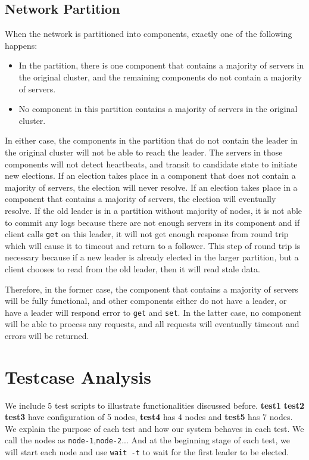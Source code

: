 \documentclass[11pt]{article}
\begin{document}
\subsection{Network Partition}

When the network is partitioned into components, exactly one of the following happens:
\begin{itemize}
    \item In the partition, there is one component that contains a majority of servers in the original cluster, and the remaining components do not contain a majority of servers.
    \item No component in this partition contains a majority of servers in the original cluster.
\end{itemize}

In either case, the components in the partition that do not contain the leader in the original cluster will not be able to reach the leader. The servers in those components will not detect heartbeats, and transit to candidate state to initiate new elections. If an election takes place in a component that does not contain a majority of servers, the election will never resolve. If an election takes place in a component that contains a majority of servers, the election will eventually resolve. If the old leader is in a partition without majority of nodes, it is not able to commit any logs because there are not enough servers in its component and if client calls \texttt{get} on this leader, it will not get enough response from round trip which will cause it to timeout and return to a follower. This step of round trip is necessary because if a new leader is already elected in the larger partition, but a client chooses to read from the old leader, then it will read stale data.

Therefore, in the former case, the component that contains a majority of servers will be fully functional, and other components either do not have a leader, or have a leader will respond error to \texttt{get} and \texttt{set}. In the latter case, no component will be able to process any requests, and all requests will eventually timeout and errors will be returned.



\section{Testcase Analysis}

We include 5 test scripts to illustrate functionalities discussed before. {\bf{test1}} {\bf{test2} \bf{test3}} have configuration of 5 nodes, {\bf test4} has 4 nodes and {\bf test5} has 7 nodes. We explain the purpose of each test and how our system behaves in each test. We call the nodes as \texttt{node-1},\texttt{node-2}... And at the beginning stage of each test, we will start each node and use \texttt{wait -t} to wait for the first leader to be elected. 
\end{document}

